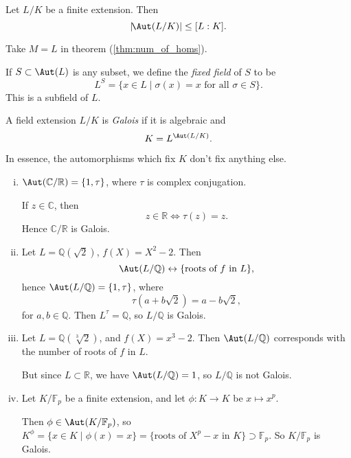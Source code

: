 \documentclass[12pt]{article}
\begin{document}
\begin{lemma}
	Let $L/K$ be a finite extension. Then
	\[
		|\!\Aut(L/K)| \leq [L:K].
	\]
\end{lemma}

\begin{proofbox}
	Take $M = L$ in theorem (\ref{thm:num_of_homs}).
\end{proofbox}

\begin{definition}
	If $S \subset \Aut(L)$ is any subset, we define the \emph{fixed field} of $S$ to be
	\[
		L^S = \{x \in L \mid \sigma(x) = x \text{ for all } \sigma \in S\}.
	\]
	This is a subfield of $L$.
\end{definition}

\begin{definition}
	A field extension $L/K$ is \emph{Galois} if it is algebraic and
	\[
	K = L^{\Aut(L/K)}.
	\]
\end{definition}

In essence, the automorphisms which fix $K$ don't fix anything else.

\begin{exbox}
	\begin{enumerate}[(i)]
		\item $\Aut(\mathbb{C}/\mathbb{R}) = \{1, \tau\}$, where $\tau$ is complex conjugation.

			If $z \in \mathbb{C}$, then
			\[
			z \in \mathbb{R} \iff \tau(z) = z.
			\]
			Hence $\mathbb{C}/\mathbb{R}$ is Galois.
		\item Let $L = \mathbb{Q}(\sqrt 2)$, $f(X) = X^2 - 2$. Then
			\[
				\Aut(L/\mathbb{Q}) \leftrightarrow \{\text{roots of } f \text{ in } L\},
			\]
			hence $\Aut(L/\mathbb{Q}) = \{1, \tau\}$, where
			\[
			\tau(a + b \sqrt 2) = a - b \sqrt 2,
			\]
			for $a, b \in \mathbb{Q}$. Then $L^{\tau} = \mathbb{Q}$, so $L/\mathbb{Q}$ is Galois.
		\item Let $L = \mathbb{Q}(\sqrt[3]2)$, and $f(X) = x^3 - 2$. Then $\Aut(L/\mathbb{Q})$ corresponds with the number of roots of $f$ in $L$.

			But since $L \subset \mathbb{R}$, we have $\Aut(L/\mathbb{Q}) = 1$, so $L/\mathbb{Q}$ is not Galois.
		\item Let $K/\mathbb{F}_p$ be a finite extension, and let $\phi : K \to K$ be $x \mapsto x^{p}$.

			Then $\phi \in \Aut(K/\mathbb{F}_p)$, so $K^{\phi} = \{x \in K \mid \phi(x) = x\} = \{\text{roots of } X^p - x \text{ in } K\} \supset \mathbb{F}_p$. So $K / \mathbb{F}_p$ is Galois.
	\end{enumerate}
\end{exbox}
\end{document}
